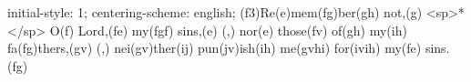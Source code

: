 initial-style: 1;
centering-scheme: english;
(f3)Re(e)mem(fg)ber(gh) not,(g) <sp>*</sp> O(f) Lord,(fe) my(fgf) sins,(e) (,) nor(e) those(fv) of(gh) my(ih) fa(fg)thers,(gv) (,) nei(gv)ther(ij) pun(jv)ish(ih) me(gvhi) for(ivih) my(fe) sins.(fg)
